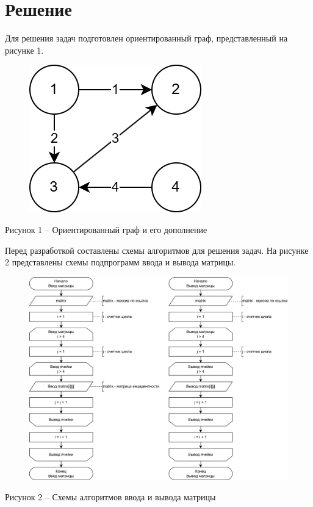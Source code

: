 \documentclass[a4paper,14pt]{extarticle}
\begin{document}
  \section*{\hspace{12.5mm}Решение}

  Для решения задач подготовлен ориентированный граф, представленный на рисунке 1.

  \begin{figure}[h]
    \centering
    \includegraphics[width=0.4\linewidth]{images/graph.png}
  \end{figure}
  \begin{center}
    Рисунок 1 – Ориентированный граф и его дополнение
  \end{center}

  \pagebreak
  Перед разработкой составлены схемы алгоритмов для решения задач. На рисунке 2 представлены схемы подпрограмм ввода и вывода матрицы.

  \begin{figure}[h]
    \centering
    \includegraphics[width=1\linewidth]{images/s-1.png}
  \end{figure}
  \begin{center}
    Рисунок 2 – Схемы алгоритмов ввода и вывода матрицы
  \end{center}
\end{document}

